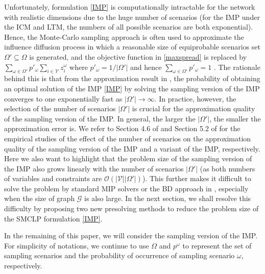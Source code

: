 \documentclass[a4paper,10pt]{article}
\theoremstyle{plain}
\newcommand{\rev}[1]{{\color{black}#1}}
\newcommand{\revv}[1]{{#1}}
\begin{document}
	Unfortunately, formulation \eqref{IMP} is computationally intractable for the network with realistic dimensions due to the huge number of scenarios (for the IMP under the ICM and LTM, the numbers of all possible scenarios are both exponential).
	Hence, the Monte-Carlo sampling approach is often used to approximate the influence diffusion process in which a reasonable size of equiprobable scenarios set $\Omega'\subseteq \Omega$ is generated, 
	and the objective function in \eqref{maxspread} is replaced by $\sum_{\omega\in \Omega'}p'_\omega\sum_{i\in \mathcal{V}}z_i^\omega $ where $p'_\omega = 1/|\Omega'|$ and hence $\sum_{\omega\in \Omega'}p'_\omega=1$ \cite{Guney2019,Wu2017}.
	The rationale behind this is that from the approximation result in \cite{Kleywegt2002}, the probability of obtaining an optimal solution of the IMP \eqref{IMP} by solving the sampling version of the IMP converges to one exponentially fast as $|\Omega'| \rightarrow \infty$. 
	In practice, however, the selection of \revv{the number of scenarios} $|\Omega'|$ is crucial for the approximation quality of the sampling version of the IMP. 
	In general, the larger the $|\Omega'|$, the smaller the approximation error is. 
	We refer to \revv{Section 4.6 of \cite{Guney2019}  and Section 5.2 of \cite{Kahr2020}} for the empirical studies of the effect of \revv{the number of scenarios} on the approximation quality of the sampling version of the IMP \revv{and a variant of the IMP}, respectively. 
	Here we also want to highlight that the problem size of the sampling version of the IMP also grows linearly with the number of scenarios $|\Omega'|$ (as both numbers of variables and constraints are $\mathcal{O}(|\mathcal{V}||\Omega'|)$).
	This further makes it difficult to solve the problem by standard MIP solvers or the BD approach in \cite{Guney2020}, 
	especially when the size of graph $\mathcal{G}$ is also large.
	In the next section, we shall resolve this difficulty by proposing two new presolving methods to reduce the problem size of the SMCLP formulation \eqref{IMP}.
	
	In the remaining of this paper, we will consider the sampling version of the IMP.
	For simplicity of notations, we continue to use $\Omega$ and $p^{\omega}$ to represent the set of sampling scenarios and the probability of occurrence of \rev{sampling} scenario $\omega$, respectively.
	
\end{document}
